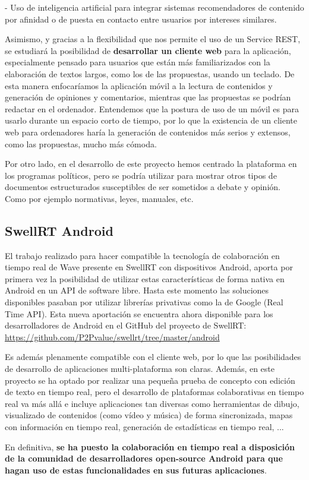 - Uso de inteligencia artificial para integrar sistemas recomendadores de contenido por afinidad o de puesta en contacto entre usuarios por intereses similares.
 
Asimismo, y gracias a la flexibilidad que nos permite el uso de un Service REST, se estudiará la posibilidad de \textbf{desarrollar un cliente web} para la aplicación, especialmente pensado para usuarios que están más familiarizados con la elaboración de textos largos, como los de las propuestas, usando un teclado. De esta manera enfocaríamos la aplicación móvil a la lectura de contenidos y generación de opiniones y comentarios, mientras que las propuestas se podrían redactar en el ordenador. Entendemos que la postura de uso de un móvil es para usarlo durante un espacio corto de tiempo, por lo que la existencia de un cliente web para ordenadores haría la generación de contenidos más serios y extensos, como las propuestas, mucho más cómoda.

Por otro lado, en el desarrollo de este proyecto hemos centrado la plataforma en los programas políticos, pero se podría utilizar para mostrar otros tipos de documentos estructurados susceptibles de ser sometidos a debate y opinión. Como por ejemplo normativas, leyes, manuales, etc.

\subsection{SwellRT Android}

El trabajo realizado para hacer compatible la tecnología de colaboración en tiempo real de Wave presente en SwellRT con dispositivos Android, aporta por primera vez la posibilidad de utilizar estas características de forma nativa en Android en un API de software libre. Hasta este momento las soluciones disponibles pasaban por utilizar librerías privativas como la de Google (Real Time API). Esta nueva aportación se encuentra ahora disponible para los desarrolladores de Android en el GitHub del proyecto de SwellRT: \url{https://github.com/P2Pvalue/swellrt/tree/master/android}

Es además plenamente compatible con el cliente web, por lo que las posibilidades de desarrollo de aplicaciones multi-plataforma son claras. Además, en este proyecto se ha optado por realizar una pequeña prueba de concepto con edición de texto en tiempo real, pero el desarrollo de plataformas colaborativas en tiempo real va más allá e incluye aplicaciones tan diversas como herramientas de dibujo, visualizado de contenidos (como vídeo y música) de forma sincronizada, mapas con información en tiempo real, generación de estadísticas en tiempo real, ...

En definitiva, \textbf{se ha puesto la colaboración en tiempo real a disposición de la comunidad de desarrolladores open-source Android para que hagan uso de estas funcionalidades en sus futuras aplicaciones}.





